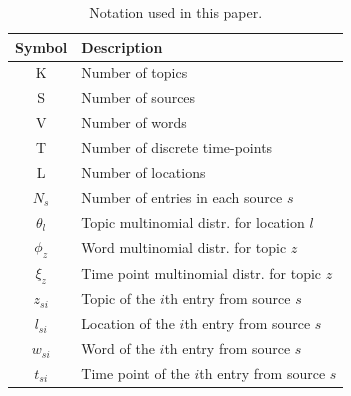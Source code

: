 \documentclass[twoside,leqno,twocolumn]{article}
\begin{document}
\begin{table}[h]
\small \centering
\captionsetup{font=scriptsize}
\caption{Notation used in this paper.}
\begin{tabular}{c l}
\hline
{\bf Symbol} & {\bf Description}  \\
\hline
K & Number of topics  \\
S & Number of sources \\
V & Number of words \\
T & Number of discrete time-points \\
L & Number of locations \\
$N_s$ & Number of entries in each source $s$\\
$\theta_l$ & Topic multinomial distr. for location $l$\\
$\phi_z$ & Word multinomial distr. for topic $z$\\
$\xi_z$ & Time point multinomial distr. for topic $z$\\
$z_{si}$ & Topic of the $i$th entry from source $s$ \\
$l_{si}$ & Location of the $i$th entry from source $s$ \\
$w_{si}$ & Word of the $i$th entry from source $s$ \\
$t_{si}$ & Time point of the $i$th entry from source $s$ \\
\hline
\end{tabular}
\label{tab:notation}
\end{table}
\end{document}

